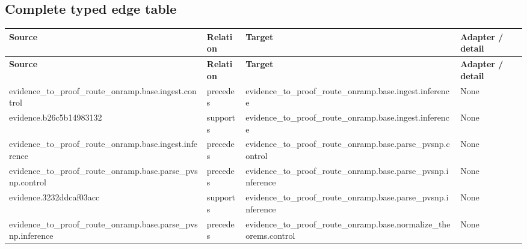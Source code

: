 \documentclass[10pt,a4paper]{article}
\begin{document}
\subsection{Complete typed edge table}
\begingroup\setlength{\tabcolsep}{2pt}\small
\begin{longtable}{@{}>{\raggedright\arraybackslash}p{.24\linewidth}>{\raggedright\arraybackslash}p{.12\linewidth}>{\raggedright\arraybackslash}p{.24\linewidth}>{\raggedright\arraybackslash}p{.20\linewidth}@{}}
\toprule
\textbf{Source} & \textbf{Relation} & \textbf{Target} & \textbf{Adapter / detail}\\\midrule
\endfirsthead
\toprule
\textbf{Source} & \textbf{Relation} & \textbf{Target} & \textbf{Adapter / detail}\\\midrule
\endhead
evidence\_\allowbreak{}to\_\allowbreak{}proof\_\allowbreak{}route\_\allowbreak{}onramp.\allowbreak{}base.\allowbreak{}ingest.\allowbreak{}control & precedes & evidence\_\allowbreak{}to\_\allowbreak{}proof\_\allowbreak{}route\_\allowbreak{}onramp.\allowbreak{}base.\allowbreak{}ingest.\allowbreak{}inference & None\\
evidence.\allowbreak{}b26c5b1498\allowbreak{}3132 & supports & evidence\_\allowbreak{}to\_\allowbreak{}proof\_\allowbreak{}route\_\allowbreak{}onramp.\allowbreak{}base.\allowbreak{}ingest.\allowbreak{}inference & None\\
evidence\_\allowbreak{}to\_\allowbreak{}proof\_\allowbreak{}route\_\allowbreak{}onramp.\allowbreak{}base.\allowbreak{}ingest.\allowbreak{}inference & precedes & evidence\_\allowbreak{}to\_\allowbreak{}proof\_\allowbreak{}route\_\allowbreak{}onramp.\allowbreak{}base.\allowbreak{}parse\_\allowbreak{}pvsnp.\allowbreak{}control & None\\
evidence\_\allowbreak{}to\_\allowbreak{}proof\_\allowbreak{}route\_\allowbreak{}onramp.\allowbreak{}base.\allowbreak{}parse\_\allowbreak{}pvsnp.\allowbreak{}control & precedes & evidence\_\allowbreak{}to\_\allowbreak{}proof\_\allowbreak{}route\_\allowbreak{}onramp.\allowbreak{}base.\allowbreak{}parse\_\allowbreak{}pvsnp.\allowbreak{}inference & None\\
evidence.\allowbreak{}3232ddcaf0\allowbreak{}3acc & supports & evidence\_\allowbreak{}to\_\allowbreak{}proof\_\allowbreak{}route\_\allowbreak{}onramp.\allowbreak{}base.\allowbreak{}parse\_\allowbreak{}pvsnp.\allowbreak{}inference & None\\
evidence\_\allowbreak{}to\_\allowbreak{}proof\_\allowbreak{}route\_\allowbreak{}onramp.\allowbreak{}base.\allowbreak{}parse\_\allowbreak{}pvsnp.\allowbreak{}inference & precedes & evidence\_\allowbreak{}to\_\allowbreak{}proof\_\allowbreak{}route\_\allowbreak{}onramp.\allowbreak{}base.\allowbreak{}normalize\_\allowbreak{}theorems.\allowbreak{}control & None\\

\end{longtable}
\end{document}
